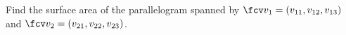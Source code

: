 \begin{frame}
\begin{example}
Find the surface area of the parallelogram spanned by $\fcv v_1 = (v_{11},v_{12}, v_{13})$ and $\fcv v_2=(v_{21}, v_{22}, v_{23})$.
\end{example}
\end{frame}